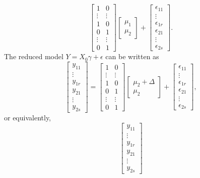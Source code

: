 \documentclass[11pt]{article}
\begin{document}
\begin{itemize}
\[\begin{bmatrix}
1 & 0 \\
\vdots & \vdots \\
1 & 0 \\
0 & 1 \\
\vdots & \vdots \\
0 & 1
\end{bmatrix} \begin{bmatrix}
\mu_1 \\ \mu_2
\end{bmatrix} + \begin{bmatrix}
\epsilon_{11} \\ \vdots \\ \epsilon_{1r} \\ \epsilon_{21} \\ \vdots \\ \epsilon_{2s}
\end{bmatrix}.
\]
The reduced model $Y = X_0\gamma + \epsilon$ can be written as
\[
\begin{bmatrix}
y_{11} \\ \vdots \\ y_{1r} \\ y_{21} \\ \vdots \\ y_{2s}
\end{bmatrix} = \begin{bmatrix}
1 & 0 \\
\vdots & \vdots \\
1 & 0 \\
0 & 1 \\
\vdots & \vdots \\
0 & 1
\end{bmatrix}\begin{bmatrix}
\mu_2 + \Delta \\ \mu_2
\end{bmatrix} + \begin{bmatrix}
\epsilon_{11} \\ \vdots \\ \epsilon_{1r} \\ \epsilon_{21} \\ \vdots \\ \epsilon_{2s}
\end{bmatrix},
\]
or equivalently, 
\[
\begin{bmatrix}
y_{11} \\ \vdots \\ y_{1r} \\ y_{21} \\ \vdots \\ y_{2s}

\end{bmatrix}\]
\end{itemize}
\end{document}
